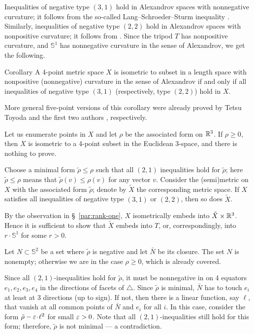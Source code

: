 \documentclass[a4paper,10pt]{article}
\begin{document}
Inequalities of negative type $(3, 1)$ hold in Alexandrov spaces with nonnegative curvature; it follows from the so-called Lang--Schroeder--Sturm inequality \cite{lang-schroeder, sturm}.
Similarly, inequalities of negative type $(2, 2)$ hold in Alexandrov spaces with nonpositive curvature; it follows from \cite[9.5]{AKP-2024}.
Since the tripod $T$ has nonpositive curvature, and $\mathbb{S}^1$ has nonnegative curvature in the sense of Alexandrov, we get the following.

\begin{thm}{Corollary}
A 4-point metric space $X$ is isometric to subset in a length space with nonpositive (nonnegative) curvature in the sense of Alexandrov if and only if all inequalities of negative type $(3, 1)$ (respectively, type $(2, 2)$) hold in $X$.
\end{thm}

More general five-point versions of this corollary were already proved by Tetsu Toyoda \cite{toyoda,lebedeva-petrunin2021} and the first two authors \cite{lebedeva-petrunin-2024}, respectively.


Let us enumerate points in $X$ and let $\rho$ be the associated form on $\mathbb{R}^3$.
If $\rho\ge 0$, then $X$ is isometric to a 4-point subset in the Euclidean 3-space,
and there is nothing to prove.

Choose a minimal form $\tilde\rho\le \rho$ such that all $(2,1)$ inequalities hold for $\tilde\rho$;
here $\tilde\rho\le \rho$ means that $\tilde\rho(v)\le \rho(v)$ for any vector $v$.
Consider the (semi)metric on $X$ with the associated form $\tilde\rho$; denote by
$\tilde X$ the corresponding metric space.
If $X$ satisfies all inequalities of negative type $(3, 1)$ or $(2,2)$, then so does $\tilde X$.

By the observation in §~\ref{par:rank-one}, $X$ isometrically embeds into $\tilde X\times \mathbb{R}^3$.
Hence it is sufficient to show that $\tilde X$ embeds into $T$, or, correspondingly, into $r\cdot \mathbb{S}^1$ for some $r>0$.

Let $N\subset \mathbb{S}^2$ be a set where $\tilde\rho$ is negative and let $\bar N$ be its closure.
The set $N$ is nonempty; otherwise we are in the case $\rho\ge 0$, which is already covered.

Since all $(2,1)$-inequalities hold for $\tilde\rho$,
it must be nonnegative in on 4 equators $e_1,e_2,e_3,e_4$ in the directions of facets of $\triangle$.
Since $\tilde\rho$ is minimal, $\bar N$ has to touch $e_i$ at least at 3 directions (up to sign). 
If not, then there is a linear function, say $\ell$, that vanish at all common points of $\bar N$ and $e_i$ for all $i$.
In this case, consider the form $\tilde\rho-\eps\cdot \ell^2$ for small $\varepsilon>0$.
Note that all $(2,1)$-inequalities still hold for this form;
therefore, $\tilde\rho$ is not minimal --- a contradiction.
\end{document}
